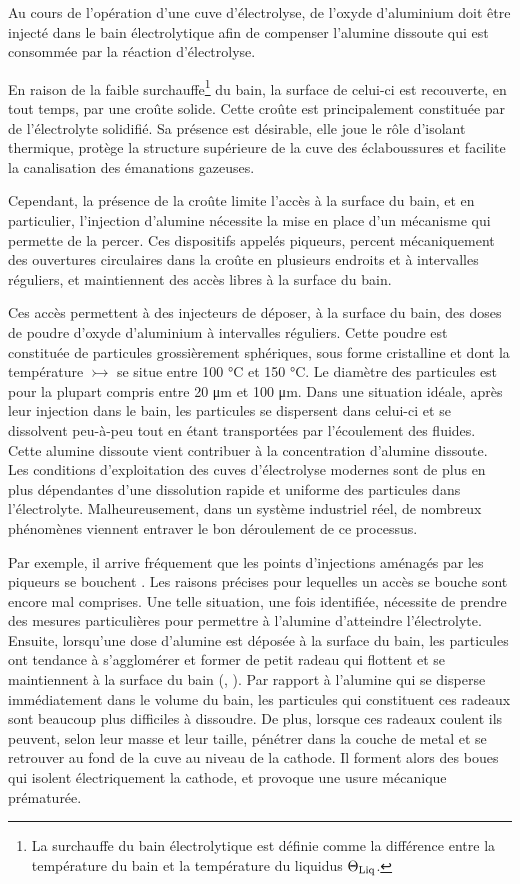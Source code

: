 Au cours de l'opération d'une cuve d'électrolyse, de l'oxyde
d'aluminium doit être injecté dans le bain électrolytique afin
de compenser l'alumine dissoute qui est consommée par la
réaction d'électrolyse.

En raison de la faible surchauffe\footnote{La surchauffe du bain
  électrolytique est définie comme la différence entre la température
  du bain et la température du liquidus $\Theta_\text{Liq}$.} du bain, la surface
de celui-ci est recouverte, en tout temps, par une croûte
solide. Cette croûte est principalement constituée par de
l'électrolyte solidifié. Sa présence est désirable, elle joue le rôle
d'isolant thermique, protège la structure supérieure de la cuve des
éclaboussures et facilite la canalisation des émanations gazeuses.

Cependant, la présence de la croûte limite l'accès à la surface du
bain, et en particulier, l'injection d'alumine nécessite la mise en
place d'un mécanisme qui permette de la percer. Ces dispositifs
appelés piqueurs, percent mécaniquement des ouvertures circulaires dans
la croûte en plusieurs endroits et à intervalles réguliers, et
maintiennent des accès libres à la surface du bain.

Ces accès permettent à des injecteurs de déposer, à la surface du
bain, des doses de poudre d'oxyde d'aluminium à intervalles
réguliers. Cette poudre est constituée de particules grossièrement
sphériques, sous forme cristalline et dont la température $\tinj$ se
situe entre \num{100} \si{\celsius} et \num{150} \si{\celsius}. Le
diamètre des particules est pour la plupart compris entre
\num{20} \si{\micro\meter} et \num{100} \si{\micro\meter}.
Dans une situation idéale, après leur injection dans le bain, les
particules se dispersent dans celui-ci et se dissolvent peu-à-peu tout
en étant transportées par l'écoulement des fluides. Cette alumine
dissoute vient contribuer à la concentration d'alumine dissoute. Les
conditions d'exploitation des cuves d'électrolyse modernes sont de
plus en plus dépendantes d'une dissolution rapide et uniforme des
particules dans l'électrolyte. Malheureusement, dans un système
industriel réel, de nombreux phénomènes viennent entraver le bon
déroulement de ce processus.

Par exemple, il arrive fréquement que les points d'injections
aménagés par les piqueurs se bouchent \cite{Dion2017}. Les raisons
précises pour lequelles un accès se bouche sont encore mal
comprises. Une telle situation, une fois identifiée, nécessite de
prendre des mesures particulières pour permettre à l'alumine
d'atteindre l'électrolyte. Ensuite, lorsqu'une dose d'alumine est
déposée à la surface du bain, les particules ont tendance à
s'agglomérer et former de petit radeau qui flottent et se maintiennent
à la surface du bain (\cite{Dassylva2015}, \cite{Kaszas2017}). Par
rapport à l'alumine qui se disperse immédiatement dans le volume
du bain, les particules qui constituent ces radeaux sont beaucoup plus
difficiles à dissoudre. De plus, lorsque ces radeaux coulent ils
peuvent, selon leur masse et leur taille, pénétrer dans la couche
de metal et se retrouver au fond de la cuve au niveau de la
cathode. Il forment alors des boues qui isolent électriquement la
cathode, et provoque une usure mécanique prématurée.

